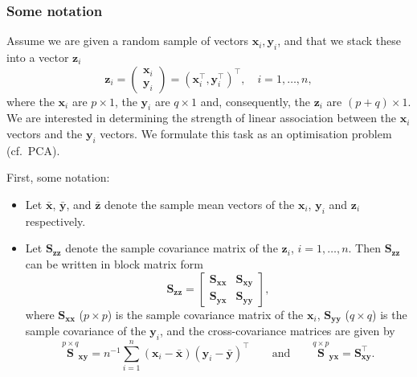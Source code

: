 \documentclass[
]{book}
\theoremstyle{definition}
\theoremstyle{definition}
\theoremstyle{definition}
\theoremstyle{definition}
\theoremstyle{remark}
\begin{document}
\hypertarget{some-notation}{%
\subsubsection*{Some notation}\label{some-notation}}

Assume we are given a random sample of vectors \(\mathbf x_i, \mathbf y_i\), and that we stack these into a vector \(\mathbf z_i\)
\[
\mathbf z_i=\left(\begin{array}{c}
\mathbf x_i\\
\mathbf y_i
\end{array}\right)=(\mathbf x_i^\top , \mathbf y_i^\top )^\top,\quad  i=1,\ldots, n,
\]
where
the \(\mathbf x_i\) are \(p \times 1\), the \(\mathbf y_i\) are \(q \times 1\) and, consequently, the \(\mathbf z_i\) are \((p+q)\times 1\). We are interested in determining the strength of linear association between the \(\mathbf x_i\) vectors and the \(\mathbf y_i\) vectors.
We formulate this task as an optimisation problem (cf.~PCA).

First, some notation:

\begin{itemize}
\item
  Let \(\bar{\mathbf x}\), \(\bar{\mathbf y}\), and \(\bar{\mathbf z}\) denote the sample mean vectors of the \(\mathbf x_i\), \(\mathbf y_i\) and \(\mathbf z_i\) respectively.
\item
  Let \(\mathbf S_{\mathbf z\mathbf z}\) denote the sample covariance matrix of the \(\mathbf z_i\), \(i=1,\ldots, n\). Then \(\mathbf S_{\mathbf z\mathbf z}\) can be written in block matrix form
  \[
  \mathbf S_{\mathbf z\mathbf z}=\left [\begin{array}{cc}
  \mathbf S_{\mathbf x\mathbf x} & \mathbf S_{\mathbf x\mathbf y}\\
  \mathbf S_{\mathbf y\mathbf x} & \mathbf S_{\mathbf y\mathbf y} \end{array} \right ],
  \]
  where \(\mathbf S_{\mathbf x\mathbf x}\) (\(p \times p\)) is the sample covariance matrix of the \(\mathbf x_i\), \(\mathbf S_{\mathbf y\mathbf y}\) (\(q \times q\)) is the sample covariance of the \(\mathbf y_i\), and the cross-covariance matrices are given by
  \[
  \stackrel{p \times q}{\mathbf S}_{\mathbf x\mathbf y}=n^{-1} \sum_{i=1}^n (\mathbf x_i -\bar{\mathbf x})(\mathbf y_i-\bar{\mathbf y})^\top
  \qquad \text{and} \qquad \stackrel{q \times p}{\mathbf S}_{\mathbf y\mathbf x}=\mathbf S_{\mathbf x\mathbf y}^\top.
  \]
\end{itemize}
\end{document}
